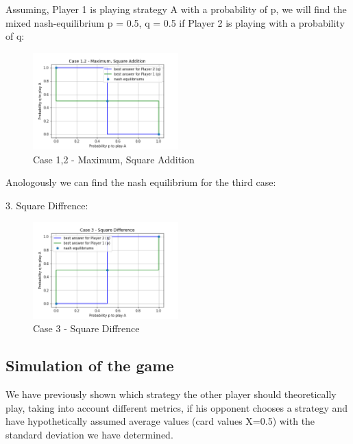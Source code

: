 Assuming, Player 1 is playing strategy A with a probability of p, we will find the mixed nash-equilibrium p = 0.5, q = 0.5 if Player 2 is playing with a probability of q:

\begin{figure}[!ht]
    \centering
    \includegraphics[width=0.5\textwidth]{Bilder/5_max}
    \caption{Case 1,2 - Maximum, Square Addition}
    \label{fig:78}
\end{figure}

Anologously we can find the nash equilibrium for the third case:

3. Square Diffrence: \\
\begin{figure}[!ht]
    \centering
    \includegraphics[width=0.5\textwidth]{Bilder/5_diff}
    \caption{Case 3 - Square Diffrence}
    \label{fig:16}
\end{figure}
\subsection{Simulation of the game}
We have previously shown which strategy the other player should theoretically play, taking into account different metrics, if his opponent chooses a strategy and have hypothetically assumed average values (card values X=0.5) with the standard deviation we have determined.

